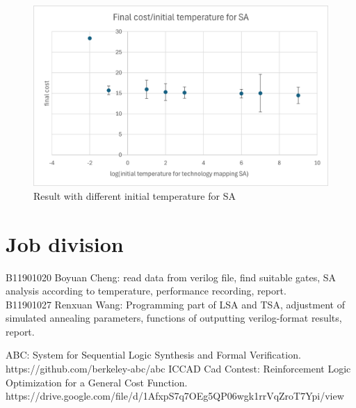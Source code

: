 \documentclass[conference]{IEEEtran}
\begin{document}
\begin{figure}
    \centering
    \includegraphics[width=0.99\linewidth]{cost.png}
    \caption{Result with different initial temperature for SA}
    \label{fig:enter-label}
\end{figure}

\section{Job division}
B11901020 Boyuan Cheng: read data from verilog file, find suitable gates, SA analysis according to temperature, performance recording, report.\\
B11901027 Renxuan Wang: Programming part of LSA and TSA, adjustment of simulated annealing parameters, functions of outputting verilog-format results, report.
\\
\begin{thebibliography}{00}
 ABC: System for Sequential Logic Synthesis and Formal Verification. https://github.com/berkeley-abc/abc
 ICCAD Cad Contest: Reinforcement Logic Optimization for a General Cost Function. https://drive.google.com/file/d/1AfxpS7q7OEg5QP06wgk1rrVqZroT7Ypi/view
\end{thebibliography}
\end{document}
